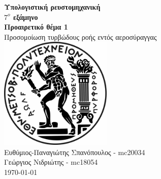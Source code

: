 \begin{center}
    \vspace{4cm}
    \huge
    \textbf{Υπολογιστική ρευστομηχανική}\\
    \textbf{ {$7^o$} εξάμηνο} \\
    \vspace{1cm}
    \LARGE
    \textbf{Προαιρετικό θέμα 1}\\
    \vspace{0.5cm}
    \LARGE
    Προσομοίωση τυρβώδους ροής εντός αεροσύραγγας     \vfill
    \includegraphics[width=0.4\textwidth]{pyrforos_bw.jpg}\\
    \vspace{4cm}
    \Large
    Ευθύμιος-Παναγιώτης Σπανόπουλος - mc20034\\
    Γεώργιος Νιδριώτης  - mc18054\\

    \today
    \vspace{2cm}
\end{center}
